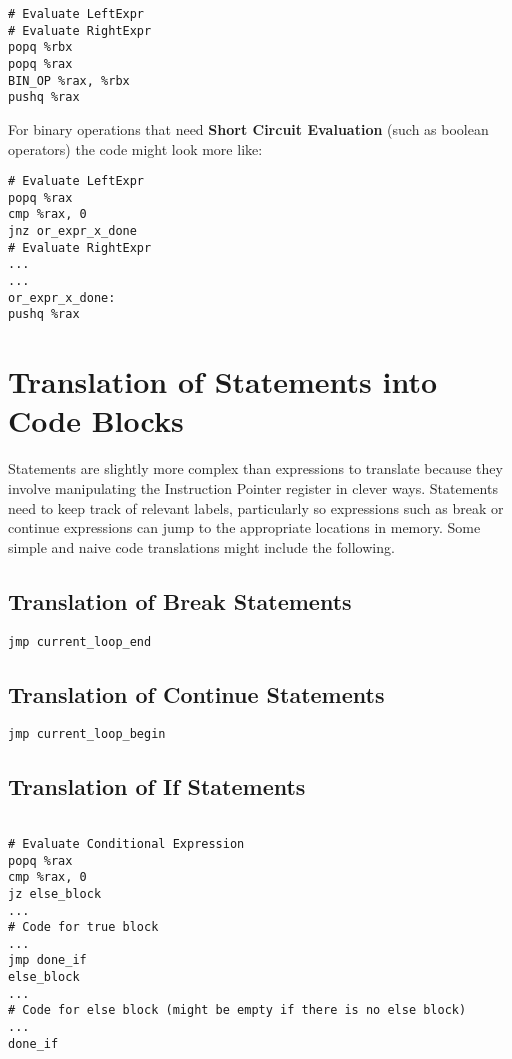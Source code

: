 \documentclass[11pt]{article}
\begin{document}
\begin{verbatim}
# Evaluate LeftExpr
# Evaluate RightExpr
popq %rbx
popq %rax
BIN_OP %rax, %rbx
pushq %rax
\end{verbatim}

\noindent For binary operations that need \textbf{Short Circuit Evaluation} (such as boolean operators) the code might look more like: 

\begin{verbatim}
# Evaluate LeftExpr
popq %rax 
cmp %rax, 0
jnz or_expr_x_done
# Evaluate RightExpr
...
...
or_expr_x_done: 
pushq %rax
\end{verbatim}


\section {Translation of Statements into Code Blocks}
Statements are slightly more complex than expressions to translate because they involve manipulating the Instruction Pointer register in clever ways. Statements need to keep track of relevant labels, particularly so expressions such as break or continue expressions can jump to the appropriate locations in memory. Some simple and naive code translations might include the following. 

\subsection{Translation of Break Statements} 

\begin{verbatim}
jmp current_loop_end
\end{verbatim}

\subsection{Translation of Continue Statements}

\begin{verbatim}
jmp current_loop_begin
\end{verbatim}

\subsection{Translation of If Statements} 

\begin{verbatim}

# Evaluate Conditional Expression 
popq %rax 
cmp %rax, 0
jz else_block
... 
# Code for true block
... 
jmp done_if
else_block
...
# Code for else block (might be empty if there is no else block)
...
done_if

\end{verbatim}
\end{document}
